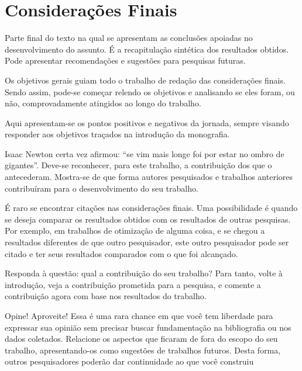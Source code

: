 \chapter{Considerações Finais}
\label{chap:consideracoes}

Parte final do texto na qual se apresentam as conclusões apoiadas no desenvolvimento do assunto. É a recapitulação sintética dos resultados obtidos. Pode apresentar recomendações e sugestões para pesquisas futuras.

Os objetivos gerais guiam todo o trabalho de redação das considerações finais. Sendo assim, pode-se começar relendo os objetivos e analisando se eles foram, ou não, comprovadamente atingidos ao longo do trabalho. 

Aqui apresentam-se os pontos positivos e negativos da jornada, sempre visando responder aos objetivos traçados na introdução da monografia.

Isaac Newton certa vez afirmou: “se vim mais longe foi por estar no ombro de gigantes”. Deve-se reconhecer, para este trabalho, a contribuição dos que o antecederam. Mostra-se de que forma autores pesquisados e trabalhos anteriores contribuíram para o desenvolvimento do seu trabalho.

É raro se encontrar citações nas considerações finais. Uma possibilidade é quando se deseja comparar os resultados obtidos com os resultados de outras pesquisas.  Por exemplo, em trabalhos de otimização de alguma coisa, e se chegou a resultados diferentes de que outro pesquisador, este outro pesquisador pode ser citado e ter seus resultados comparados com o que foi alcançado.

Responda à questão: qual a contribuição do seu trabalho? Para tanto, volte à introdução, veja a contribuição prometida para a pesquisa, e comente a contribuição agora com base nos resultados do trabalho.

Opine! Aproveite! Essa é uma rara chance em que você tem liberdade para expressar sua opinião sem precisar buscar fundamentação na bibliografia ou nos dados coletados.
Relacione os aspectos que ficaram de fora do escopo do seu trabalho, apresentando-os como sugestões de trabalhos futuros. Desta forma, outros pesquisadores poderão dar continuidade ao que você construiu
